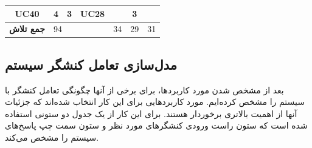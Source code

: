 \documentclass[12pt]{article}
\begin{document}
\begin{longtable}{|c|ccc|l|l|l|}
		UC40                 & \multicolumn{1}{c|}{4}               & \multicolumn{1}{c|}{3}                                                                         & UC28               &                                                                                            & \multicolumn{1}{c|}{3}                                                                        &                                                                                            \\ \hline
		\textbf{جمع تلاش}    & \multicolumn{3}{l|}{94}                                                                                                                                    & 34                                                                                         & 29                                                                                            & 31                                                                                         \\ \hline
	\end{longtable}

	\subsection{مدل‌سازی تعامل کنشگر سیستم}
	بعد از مشخص شدن مورد کاربردها، برای برخی از آنها چگونگی تعامل کنشگر با سیستم را مشخص کرده‌ایم. مورد کاربردهایی برای این کار انتخاب شده‌اند که جزئیات آنها از اهمیت بالاتری برخوردار هستند.
	برای این کار از یک جدول دو ستونی استفاده شده است که ستون راست ورودی کنشگرهای مورد نظر و ستون سمت چپ پاسخ‌های سیستم را مشخص می‌کند.
\end{document}
